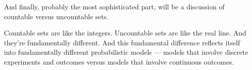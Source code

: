 \documentclass[pdftex, brazil, 12pt, twoside]{article}
\begin{document}
And finally, probably the most sophisticated part, will be a
discussion of countable versus uncountable sets.

Countable sets are like the integers.
Uncountable sets are like the real line.
And they're fundamentally different.
And this fundamental difference reflects itself
into fundamentally different probabilistic models ---
models that involve discrete experiments and outcomes
versus models that involve continuous outcomes.





\end{document}
